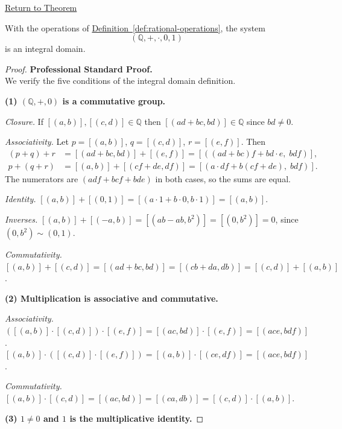 \newpage
{}
\label{prf:q-is-integral-domain}

\begin{remark*}[Return]
\hyperref[thm:q-is-integral-domain]{Return to Theorem}
\end{remark*}

\begin{theorem*}
With the operations of
\hyperref[def:rational-operations]{Definition~\ref*{def:rational-operations}},
the system
\[
(\mathbb{Q},+,\cdot,0,1)
\]
is an integral domain.
\end{theorem*}

\begin{proof}
\textbf{Professional Standard Proof.}~\\
We verify the five conditions of the integral domain definition.

\textbf{(1) $(\mathbb{Q},+,0)$ is a commutative group.}

\emph{Closure.} If $[(a,b)],[(c,d)]\in\mathbb{Q}$ then
$[(ad+bc,bd)]\in\mathbb{Q}$ since $bd\neq 0$.

\emph{Associativity.} Let $p = [(a,b)]$, $q = [(c,d)]$, $r = [(e,f)]$.
Then
\begin{align*}
(p+q)+r &= [(ad+bc,bd)] + [(e,f)] = [((ad+bc)f + bd\cdot e,\; bdf)], \\
p+(q+r) &= [(a,b)] + [(cf+de,df)] = [(a\cdot df + b(cf+de),\; bdf)].
\end{align*}
The numerators are $(adf + bcf + bde)$ in both cases, so the sums are equal.

\emph{Identity.} $[(a,b)] + [(0,1)] = [(a\cdot 1 + b\cdot 0, b\cdot 1)] = [(a,b)]$.

\emph{Inverses.} $[(a,b)] + [(-a,b)] = [(ab - ab, b^2)] = [(0,b^2)] = 0$,
since $(0,b^2)\sim(0,1)$.

\emph{Commutativity.} $[(a,b)]+[(c,d)] = [(ad+bc,bd)] = [(cb+da,db)] = [(c,d)]+[(a,b)]$.

\textbf{(2) Multiplication is associative and commutative.}

\emph{Associativity.}
$([(a,b)]\cdot[(c,d)])\cdot[(e,f)] = [(ac,bd)]\cdot[(e,f)] = [(ace,bdf)]$.
$[(a,b)]\cdot([(c,d)]\cdot[(e,f)]) = [(a,b)]\cdot[(ce,df)] = [(ace,bdf)]$.

\emph{Commutativity.}
$[(a,b)]\cdot[(c,d)] = [(ac,bd)] = [(ca,db)] = [(c,d)]\cdot[(a,b)]$.

\textbf{(3) $1\neq 0$ and $1$ is the multiplicative identity.}


\end{proof}
